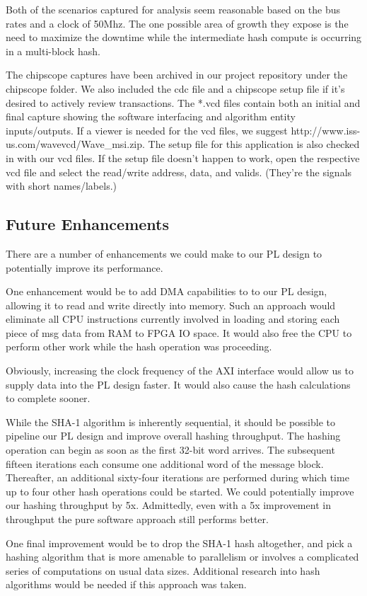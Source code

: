 \documentclass[journal]{IEEEtran}
\begin{document}
Both of the scenarios captured for analysis seem reasonable based on the bus rates and a clock of 50Mhz.  The one possible area of growth they expose is the need to maximize the downtime while the intermediate hash compute is occurring in a multi-block hash.

The chipscope captures have been archived in our project repository under the chipscope folder.  We also included the cdc file and a chipscope setup file if it’s desired to actively review transactions.  The *.vcd files contain both an initial and final capture showing the software interfacing and algorithm entity inputs/outputs.  If a viewer is needed for the vcd files, we suggest http://www.iss-us.com/wavevcd/Wave\_msi.zip.  The setup file for this application is also checked in with our vcd files.  If the setup file doesn't happen to work, open the respective vcd file and select the read/write address, data, and valids.  (They’re the signals with short names/labels.)
\subsection{Future Enhancements}
There are a number of enhancements we could make to our PL design to potentially improve its performance.

One enhancement would be to add DMA capabilities to to our PL design, allowing it to read and write directly into memory.  Such an approach would eliminate all CPU instructions currently involved in loading and storing each piece of msg data from RAM to FPGA IO space.  It would also free the CPU to perform other work while the hash operation was proceeding.

Obviously, increasing the clock frequency of the AXI interface would allow us to supply data into the PL design faster.  It would also cause the hash calculations to complete sooner.

While the SHA-1 algorithm is inherently sequential, it should be possible to pipeline our PL design and improve overall hashing throughput.  The hashing operation can begin as soon as the first 32-bit word arrives.  The subsequent fifteen iterations each consume one additional word of the message block.  Thereafter, an additional sixty-four iterations are performed during which time up to four other hash operations could be started.  We could potentially improve our hashing throughput by 5x.  Admittedly, even with a 5x improvement in throughput the pure software approach still performs better.

One final improvement would be to drop the SHA-1 hash altogether, and pick a hashing algorithm that is more amenable to parallelism or involves a complicated series of computations on usual data sizes.  Additional research into hash algorithms would be needed if this approach was taken.
\end{document}
